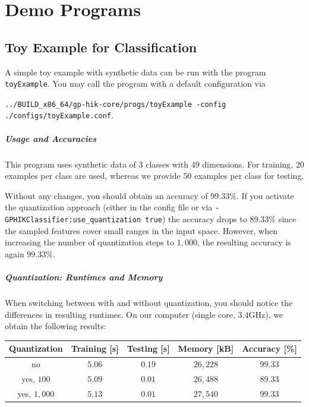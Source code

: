 \documentclass[a4paper]{scrreprt}
\begin{document}
\chapter{Demo Programs}
\label{chap:DemoProgs}

\section{Toy Example for Classification}

A simple toy example with synthetic data can be run with the program  \texttt{toyExample}. You may call the program with a default configuration via 

  \texttt{../BUILD\_x86\_64/gp-hik-core/progs/toyExample -config ./configs/toyExample.conf}.

\paragraph{Usage and Accuracies}
This program uses synthetic data of $3$ classes with $49$ dimensions. For training, $20$ examples per class are used, whereas we provide $50$ examples per class for testing. 

Without any changes, you should obtain an accuracy of $99.33\%$. If you activate the quantization approach (either in the config file or via 
\texttt{-GPHIKClassifier:use\_quantization true}) the accuracy drops to $89.33\%$ since the sampled features cover small ranges in the input space. However, 
when increasing the number of quantization steps to $1,000$, the resulting accuracy is again $99.33\%$.

\paragraph{Quantization: Runtimes and Memory}
When switching between with and without quantization, you should notice the differences in resulting runtimes. On our computer (single core, $3.4$GHz), 
we obtain the following results:

\begin{center}
 \begin{tabular}{ccccc}
    \textbf{Quantization} & \textbf{Training [s]} & \textbf{Testing [s]} & \textbf{Memory [kB]} & \textbf{Accuracy [\%]}\\
     \hline
    no                    & $5.06$                & $0.19$               & $26,228$             &  $99.33$\\
    yes, $100$            & $5.09$                & $0.01$               & $26,488$             &  $89.33$ \\
    yes, $1,000$          & $5.13$                & $0.01$               & $27,540$             &  $99.33$ \\
  \end{tabular}
\end{center}
\end{document}
